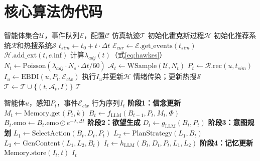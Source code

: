 \documentclass[a4paper,fleqn]{cas-sc}
\begin{document}
\appendix

\section{核心算法伪代码}

\noindent
\begin{minipage}[t]{0.48\textwidth}
\begin{algorithm}[H]
\caption{POSIM仿真主循环}
\label{alg:main}
\begin{algorithmic}[1]
\REQUIRE 智能体集合$\mathcal{U}$，事件队列$\mathcal{E}$，配置$\mathcal{C}$
\ENSURE 仿真轨迹$\mathcal{T}$
\STATE 初始化霍克斯过程$\mathcal{H}$
\STATE 初始化推荐系统$\mathcal{R}$和热搜系统$\mathcal{S}$
 \STATE $t_{sim} \leftarrow t_0 + t \cdot \Delta t$
 \STATE $\mathcal{E}_{cur} \leftarrow \mathcal{E}.\text{get\_events}(t_{sim})$
 \STATE $\mathcal{H}.\text{add\_ext}(t, e.\text{inf})$
 \ENDFOR
 \STATE 计算$\lambda_{adj}(t)$（式\ref{eq:hawkes}）
 \STATE $N_t \!\leftarrow\! \text{Poisson}(\lambda_{adj} \!\cdot\! N_{s} \!\cdot\! \Delta t / 60)$
 \STATE $\mathcal{A}_t \leftarrow \text{WSample}(\mathcal{U}, N_t)$
 \STATE $P_t \leftarrow \mathcal{R}.\text{rec}(u, t_{sim})$
 \STATE $I_u \leftarrow \text{EBDI}(u, P_t, \mathcal{E}_{ctx})$
 \STATE 执行$I_u$并更新$\mathcal{H}$
 \ENDFOR
 \STATE 情绪传染；更新热搜$\mathcal{S}$
 \STATE $\mathcal{T} \leftarrow \mathcal{T} \cup \{(t, \mathcal{A}_t, I)\}$
\ENDFOR
\RETURN $\mathcal{T}$
\end{algorithmic}
\end{algorithm}
\end{minipage}
\hfill
\begin{minipage}[t]{0.48\textwidth}
\begin{algorithm}[H]
\caption{EBDI认知决策管线}
\label{alg:ebdi}
\begin{algorithmic}[1]
\REQUIRE 智能体$u$，感知$P_t$，事件$\mathcal{E}_{ctx}$
\ENSURE 行为序列$I_t$
\STATE \textbf{阶段1：信念更新}
\STATE $M_t \leftarrow \text{Memory.get}(P_t, k)$
\STATE $B_t \leftarrow f_{\text{LLM}}(B_{t-1}, P_t, M_t, \Phi)$
\STATE $B_t.\text{emo} \leftarrow B_t.\text{emo} \odot e^{-\lambda_e \Delta t}$
\STATE \textbf{阶段2：欲望生成}
\STATE $D_t \leftarrow g_{\text{LLM}}(B_t, P_t)$
\STATE \textbf{阶段3：意图规划}
\STATE $L_1 \leftarrow \text{SelectAction}(B_t, D_t, P_t)$
\STATE $L_2 \leftarrow \text{PlanStrategy}(L_1, B_t)$
\STATE $L_3 \leftarrow \text{GenContent}(L_1, L_2, B_t)$
\STATE $I_t \leftarrow h_{\text{LLM}}(B_t, D_t, P_t, L_1, L_2)$
\STATE \textbf{阶段4：记忆更新}
\STATE $\text{Memory.store}(I_t, t)$
\RETURN $I_t$
\end{algorithmic}
\end{algorithm}
\end{minipage}
\end{document}
